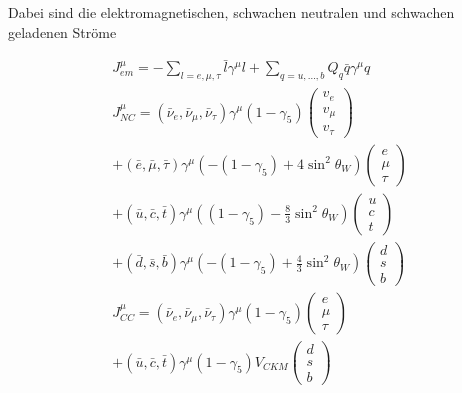\documentclass[10pt, letterpaper]{article}
\begin{document}
Dabei sind die elektromagnetischen, schwachen neutralen und schwachen geladenen Ströme

$$
\begin{gathered}
J_{e m}^{\mu}=-\sum_{l=e, \mu, \tau} \bar{l} \gamma^{\mu} l+\sum_{q=u, \ldots, b} Q_{q} \bar{q} \gamma^{\mu} q \\
J_{N C}^{\mu}=\left(\bar{\nu}_{e}, \bar{\nu}_{\mu}, \bar{\nu}_{\tau}\right) \gamma^{\mu}\left(1-\gamma_{5}\right)\left(\begin{array}{c}
v_{e} \\
v_{\mu} \\
v_{\tau}
\end{array}\right) \\
+(\bar{e}, \bar{\mu}, \bar{\tau}) \gamma^{\mu}\left(-\left(1-\gamma_{5}\right)+4 \sin ^{2} \theta_{W}\right)\left(\begin{array}{c}
e \\
\mu \\
\tau
\end{array}\right) \\
+(\bar{u}, \bar{c}, \bar{t}) \gamma^{\mu}\left(\left(1-\gamma_{5}\right)-\frac{8}{3} \sin ^{2} \theta_{W}\right)\left(\begin{array}{c}
u \\
c \\
t
\end{array}\right) \\
+(\bar{d}, \bar{s}, \bar{b}) \gamma^{\mu}\left(-\left(1-\gamma_{5}\right)+\frac{4}{3} \sin ^{2} \theta_{W}\right)\left(\begin{array}{c}
d \\
s \\
b
\end{array}\right) \\
J_{C C}^{\mu}=\left(\bar{\nu}_{e}, \bar{\nu}_{\mu}, \bar{\nu}_{\tau}\right) \gamma^{\mu}\left(1-\gamma_{5}\right)\left(\begin{array}{c}
e \\
\mu \\
\tau
\end{array}\right) \\
+(\bar{u}, \bar{c}, \bar{t}) \gamma^{\mu}\left(1-\gamma_{5}\right) V_{C K M}\left(\begin{array}{c}
d \\
s \\
b
\end{array}\right)
\end{gathered}
$$
\end{document}

